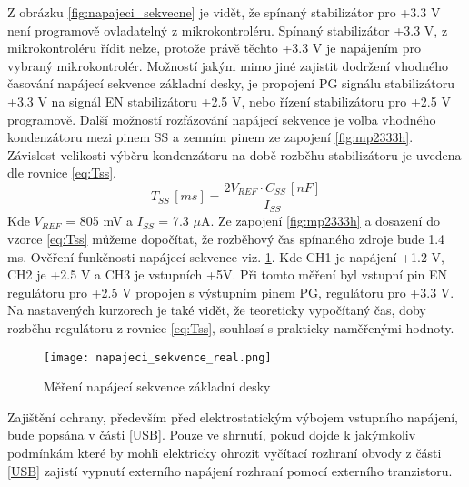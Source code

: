	\par Z obrázku \ref{fig:napajeci_sekvecne} je vidět, že spínaný stabilizátor pro +3.3 V není programově ovladatelný z mikrokontroléru. Spínaný stabilizátor +3.3 V, z mikrokontroléru řídit nelze, protože právě těchto +3.3 V je napájením pro vybraný mikrokontrolér. Možností jakým mimo jiné zajistit dodržení vhodného časování napájecí sekvence základní desky, je propojení PG signálu stabilizátoru +3.3 V na signál EN stabilizátoru +2.5 V, nebo řízení stabilizátoru pro +2.5 V programově. Další možností rozfázování napájecí sekvence je volba vhodného kondenzátoru mezi pinem SS a zemním pinem ze zapojení \ref{fig:mp2333h}. Závislost velikosti výběru kondenzátoru na době rozběhu stabilizátoru je uvedena dle rovnice \ref{eq:Tss}.
	\begin{equation}
		T_{SS}\,[ms] = \frac{2V_{REF} \cdot C_{SS} \,[nF]}{I_{SS}}
		\label{eq:Tss}
	\end{equation}
	Kde $V_{REF}$ = 805 mV a $I_{SS}$ = 7.3 $\mu$A. Ze zapojení \ref{fig:mp2333h} a dosazení do vzorce \ref{eq:Tss} můžeme dopočítat, že rozběhový čas spínaného zdroje bude 1.4 ms. Ověření funkčnosti napájecí sekvence viz. \ref{fig:napajeci_sekvecne_real}. Kde CH1 je napájení +1.2 V, CH2 je +2.5 V a CH3 je vstupních +5V. Při tomto měření byl vstupní pin EN regulátoru pro +2.5 V propojen s výstupním pinem PG, regulátoru pro +3.3 V. Na nastavených kurzorech je také vidět, že teoreticky vypočítaný čas, doby rozběhu regulátoru z rovnice \ref{eq:Tss}, souhlasí s prakticky naměřenými hodnoty. 
	\begin{figure}[h!]
		\centering
		\captionsetup{justification=centering}
		\texttt{[image: napajeci\_sekvence\_real.png]}
		\caption{Měření napájecí sekvence základní desky} 
		\label{fig:napajeci_sekvecne_real}
	\end{figure}
	\par Zajištění ochrany, především před elektrostatickým výbojem vstupního napájení, bude popsána v části \ref{USB}. Pouze ve shrnutí, pokud dojde k jakýmkoliv podmínkám které by mohli elektricky ohrozit vyčítací rozhraní obvody z části \ref{USB} zajistí vypnutí externího napájení rozhraní pomocí externího tranzistoru. 


